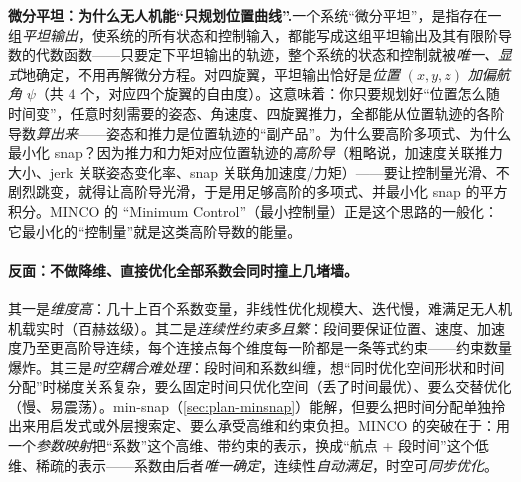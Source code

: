 \begin{insight}
\textbf{微分平坦：为什么无人机能“只规划位置曲线”.}\;一个系统“微分平坦”，是指存在一组\emph{平坦输出}，使系统的所有状态和控制输入，都能写成这组平坦输出及其有限阶导数的代数函数——只要定下平坦输出的轨迹，整个系统的状态和控制就被\emph{唯一、显式}地确定，不用再解微分方程。对四旋翼，平坦输出恰好是\emph{位置} $(x,y,z)$ \emph{加偏航角} $\psi$（共 $4$ 个，对应四个旋翼的自由度）。这意味着：你只要规划好“位置怎么随时间变”，任意时刻需要的姿态、角速度、四旋翼推力，全都能从位置轨迹的各阶导数\emph{算出来}——姿态和推力是位置轨迹的“副产品”。为什么要高阶多项式、为什么最小化 snap？因为推力和力矩对应位置轨迹的\emph{高阶导}（粗略说，加速度关联推力大小、jerk 关联姿态变化率、snap 关联角加速度/力矩）——要让控制量光滑、不剧烈跳变，就得让高阶导光滑，于是用足够高阶的多项式、并最小化 snap 的平方积分。MINCO 的 “Minimum Control”（最小控制量）正是这个思路的一般化：它最小化的“控制量”就是这类高阶导数的能量。
\end{insight}

\paragraph{反面：不做降维、直接优化全部系数会同时撞上几堵墙。}
其一是\emph{维度高}：几十上百个系数变量，非线性优化规模大、迭代慢，难满足无人机机载实时（百赫兹级）。其二是\emph{连续性约束多且繁}：段间要保证位置、速度、加速度乃至更高阶导连续，每个连接点每个维度每一阶都是一条等式约束——约束数量爆炸。其三是\emph{时空耦合难处理}：段时间和系数纠缠，想“同时优化空间形状和时间分配”时梯度关系复杂，要么固定时间只优化空间（丢了时间最优）、要么交替优化（慢、易震荡）。min-snap（\cref{sec:plan-minsnap}）能解，但要么把时间分配单独拎出来用启发式或外层搜索定、要么承受高维和约束负担。MINCO 的突破在于：用一个\emph{参数映射}把“系数”这个高维、带约束的表示，换成“航点 + 段时间”这个低维、稀疏的表示——系数由后者\emph{唯一确定}，连续性\emph{自动满足}，时空可\emph{同步优化}。

